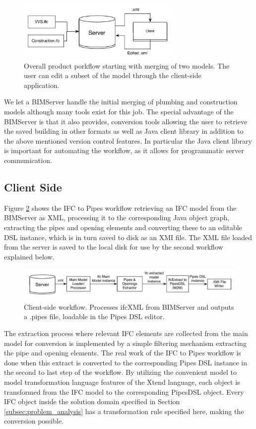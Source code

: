 \begin{figure}[t]
    \centering
        \includegraphics[width=80mm]{images/CompleteWorkflow.pdf}
    \caption{Overall product porkflow starting with merging of two models. The user can edit a subset of the model through the client-side application.}
    \label{fig:overall_product_workflow}
\end{figure}

We let a BIMServer handle the initial merging of plumbing and construction models although many tools exist for this job. The special advantage of the BIMServer is that it also provides, conversion tools allowing the user to retrieve the saved building in other formats as well as Java client library in addition to the above mentioned version control features. In particular the Java client library is important for automating the workflow, as it allows for programmatic server communication.

\subsection{Client Side}
Figure \ref{fig:IFC2PipesWorkflow} shows the IFC to Pipes workflow retrieving an IFC model from the BIMServer as XML, processing it to the corresponding Java object graph, extracting the pipes and opening elements and converting these to an editable DSL instance, which is in turn saved to disk as an XMI file. The XML file loaded from the server is saved to the local disk for use by the second workflow explained below.

\begin{figure}[t]
    \centering
        \includegraphics[width=120mm]{images/IFC2Pipes.pdf}
    \caption{Client-side workflow. Processes ifcXML from BIMServer and outputs a .pipes file, loadable in the Pipes DSL editor.}
    \label{fig:IFC2PipesWorkflow}
\end{figure}

The extraction process where relevant IFC elements are collected from the main model for conversion is implemented by a simple filtering mechanism extracting the pipe and opening elements. The real work of the IFC to Pipes workflow is done when this extract is converted to the corresponding Pipes DSL instance in the second to last step of the workflow. By utilizing the convenient model to model transformation language features of the Xtend language, each object is transformed from the IFC model to the corresponding PipesDSL object. Every IFC object inside the solution domain specified in Section \ref{subsec:problem_analysis} has a transformation rule specified here, making the conversion possible.


